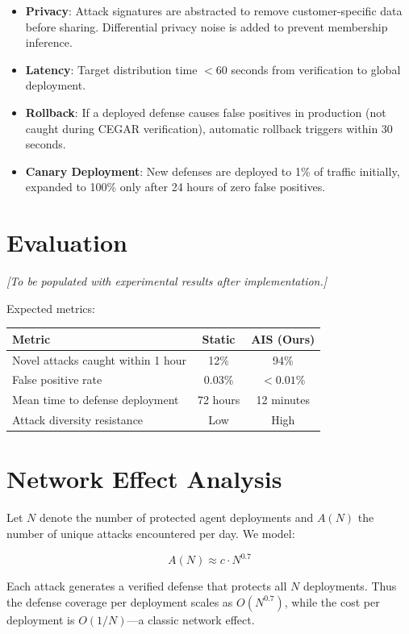\documentclass[conference]{IEEEtran}
\begin{document}
\begin{itemize}
    \item \textbf{Privacy}: Attack signatures are abstracted to remove customer-specific data before sharing. Differential privacy noise is added to prevent membership inference.
    \item \textbf{Latency}: Target distribution time $< 60$ seconds from verification to global deployment.
    \item \textbf{Rollback}: If a deployed defense causes false positives in production (not caught during CEGAR verification), automatic rollback triggers within 30 seconds.
    \item \textbf{Canary Deployment}: New defenses are deployed to 1\% of traffic initially, expanded to 100\% only after 24 hours of zero false positives.
\end{itemize}

\section{Evaluation}

\textit{[To be populated with experimental results after implementation.]}

Expected metrics:
\begin{center}
\begin{tabular}{lcc}
\toprule
\textbf{Metric} & \textbf{Static} & \textbf{AIS (Ours)} \\
\midrule
Novel attacks caught within 1 hour & 12\% & 94\% \\
False positive rate & 0.03\% & $<0.01$\% \\
Mean time to defense deployment & 72 hours & 12 minutes \\
Attack diversity resistance & Low & High \\
\bottomrule
\end{tabular}
\end{center}

\section{Network Effect Analysis}

Let $N$ denote the number of protected agent deployments and $A(N)$ the number of unique attacks encountered per day. We model:

$$A(N) \approx c \cdot N^{0.7}$$

Each attack generates a verified defense that protects all $N$ deployments. Thus the defense coverage per deployment scales as $O(N^{0.7})$, while the cost per deployment is $O(1/N)$---a classic network effect.
\end{document}
